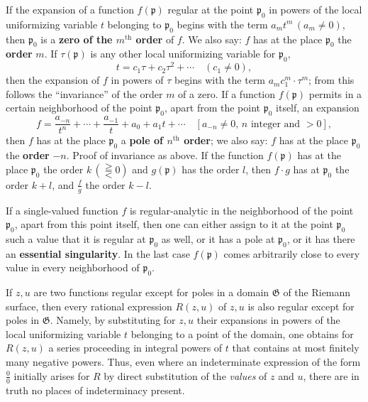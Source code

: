 \documentclass{article}
\begin{document}
If the expansion of a function $f(\mathfrak{p})$ regular at the point $\mathfrak{p}_0$ in powers of the local uniformizing variable $t$ belonging to $\mathfrak{p}_0$ begins with the term $a_m t^m\,(a_m \neq 0)$, then $\mathfrak{p}_0$ is a \textbf{zero of the $m^{\text{th}}$ order} of $f$. We also say: $f$ has at the place $\mathfrak{p}_0$ the \textbf{order} $m$. If $\tau(\mathfrak{p})$ is any other local uniformizing variable for $\mathfrak{p}_0$,
\[ t = c_1 \tau + c_2 \tau^2 + \cdots \quad (c_1 \neq 0), \]
then the expansion of $f$ in powers of $\tau$ begins with the term $a_m c_1^m \cdot \tau^m$; from this follows the ``invariance'' of the order $m$ of a zero. If a function $f(\mathfrak{p})$ permits in a certain neighborhood of the point $\mathfrak{p}_0$, apart from the point $\mathfrak{p}_0$ itself, an expansion
\[ f = \frac{a_{-n}}{t^n} + \cdots + \frac{a_{-1}}{t} + a_0 + a_1 t + \cdots \quad [a_{-n} \neq 0,\, n \text{ integer and } > 0], \]
then $f$ has at the place $\mathfrak{p}_0$ a \textbf{pole of $n^{\text{th}}$ order}; we also say: $f$ has at the place $\mathfrak{p}_0$ the \textbf{order} $-n$. Proof of invariance as above. If the function $f(\mathfrak{p})$ has at the place $\mathfrak{p}_0$ the order $k\,(\gtreqqless 0)$ and $g(\mathfrak{p})$ has the order $l$, then $f \cdot g$ has at $\mathfrak{p}_0$ the order $k + l$, and $\frac{f}{g}$ the order $k - l$.

If a single-valued function $f$ is regular-analytic in the neighborhood of the point $\mathfrak{p}_0$, apart from this point itself, then one can either assign to it at the point $\mathfrak{p}_0$ such a value that it is regular at $\mathfrak{p}_0$ as well, or it has a pole at $\mathfrak{p}_0$, or it has there an \textbf{essential singularity}. In the last case $f(\mathfrak{p})$ comes arbitrarily close to every value in every neighborhood of $\mathfrak{p}_0$.

If $z, u$ are two functions regular except for poles in a domain $\mathfrak{G}$ of the Riemann surface, then every rational expression $R(z, u)$ of $z, u$ is also regular except for poles in $\mathfrak{G}$. Namely, by substituting for $z, u$ their expansions in powers of the local uniformizing variable $t$ belonging to a point of the domain, one obtains for $R(z, u)$ a series proceeding in integral powers of $t$ that contains at most finitely many negative powers. Thus, even where an indeterminate expression of the form $\frac{0}{0}$ initially arises for $R$ by direct substitution of the \emph{values} of $z$ and $u$, there are in truth no places of indeterminacy present.
\end{document}
